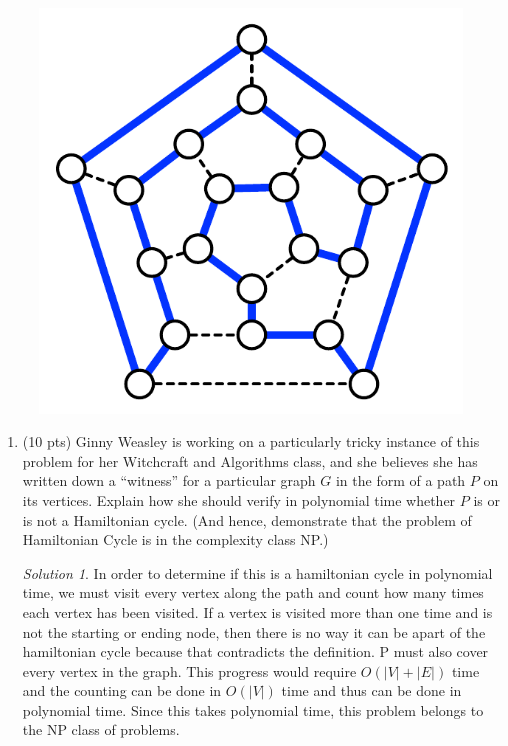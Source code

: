 \documentclass[12pt]{article}
\theoremstyle{remark}
\newtheorem*{solution}{Solution}
\begin{document}
\begin{enumerate}
\begin{figure}[h!]
\begin{center}
\includegraphics[scale=0.7]{hamiltonian.pdf} 
\end{center}
\vspace{-4mm}
\end{figure}


	\begin{enumerate}
	\item (10 pts) Ginny Weasley is working on a particularly tricky instance of this problem for her Witchcraft and Algorithms class, and she believes she has written down a ``witness'' for a particular graph $G$ in the form of a path $P$ on its vertices. Explain how she should verify in polynomial time whether $P$ is or is not a Hamiltonian cycle. (And hence, demonstrate that the problem of Hamiltonian Cycle is in the complexity class NP.)
	\begin{solution}
    In order to determine if this is a hamiltonian cycle in polynomial time, we must visit every vertex along the path and count how many times each vertex has been visited. If a vertex is visited more than one time and is not the starting or ending node, then there is no way it can be apart of the hamiltonian cycle because that contradicts the definition. P must also cover every vertex in the graph. This progress would require $O(|V| + |E|)$ time and the counting can be done in $O(|V|)$ time and thus can be done in polynomial time. Since this takes polynomial time, this problem belongs to the NP class of problems.
    \end{solution}
    \pagebreak
    

\end{enumerate}
\end{enumerate}
\end{document}
